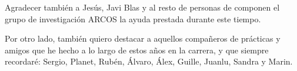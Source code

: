 Agradecer también a Jesús, Javi Blas y al resto de personas de componen el grupo de investigación ARCOS la ayuda prestada durante este tiempo.

Por otro lado, también quiero destacar a aquellos compañeros de prácticas y amigos que he hecho a lo largo de estos años en la carrera, y que siempre recordaré: Sergio, Planet, Rubén, Álvaro, Álex, Guille, Juanlu, Sandra y Marin.



\thispagestyle{empty}



\begin{abstractpage}

\end{abstractpage}

% 

\afterpage{\blankpage} %
